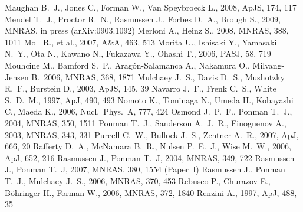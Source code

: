 \documentclass[useAMS,usenatbib]{mn2e}
\begin{document}
\begin{thebibliography}{}
   Maughan B.~J., Jones C., Forman W., Van Speybroeck L., 2008, ApJS, 174, 117 
   Mendel T.~J., Proctor R.~N., Rasmussen J., Forbes D.~A., Brough S., 2009,
   MNRAS, in press (arXiv:0903.1092)
   Merloni A., Heinz S., 2008, MNRAS, 388, 1011 
   Moll R., et al., 2007, A\&A, 463, 513 
   Morita U., Ishisaki Y., Yamasaki N.~Y., Ota N., Kawano N., Fukazawa Y., 
   Ohashi T., 2006, PASJ, 58, 719 
   Mouhcine M., Bamford S.~P., Arag{\'o}n-Salamanca A., Nakamura O., 
   Milvang-Jensen B.\ 2006, MNRAS, 368, 1871 
   Mulchaey J.~S., Davis D.~S., Mushotzky R.~F., Burstein D., 2003, ApJS, 145, 
   39 
   Navarro J.~F., Frenk C.~S., White S.~D.~M., 1997, ApJ, 490, 493 
   Nomoto K., Tominaga N., Umeda H., Kobayashi C., Maeda K., 2006, 
   Nucl.\ Phys.\ A, 777, 424
   Osmond J.~P.~F., Ponman T.~J., 2004, MNRAS, 350, 1511 
   Ponman T.~J.,  Sanderson A.~J.~R., Finoguenov A., 2003, MNRAS, 343, 331    
   Purcell C.~W., Bullock J.~S., Zentner A.~R., 2007, ApJ, 666, 20  
   Rafferty D.~A., McNamara B.~R., Nulsen P.~E.~J., Wise M.~W., 2006, ApJ, 652,
   216 
   Rasmussen J., Ponman T.~J, 2004, MNRAS, 349, 722
   Rasmussen J., Ponman T.~J, 2007, MNRAS, 380, 1554 (Paper~I)
   Rasmussen J., Ponman T.~J., Mulchaey J.~S., 2006, MNRAS, 370, 453 
   Rebusco P., Churazov E., B{\"o}hringer H., Forman W., 2006, MNRAS, 372, 
   1840
   Renzini A., 1997, ApJ, 488, 35   

\end{thebibliography}
\end{document}
